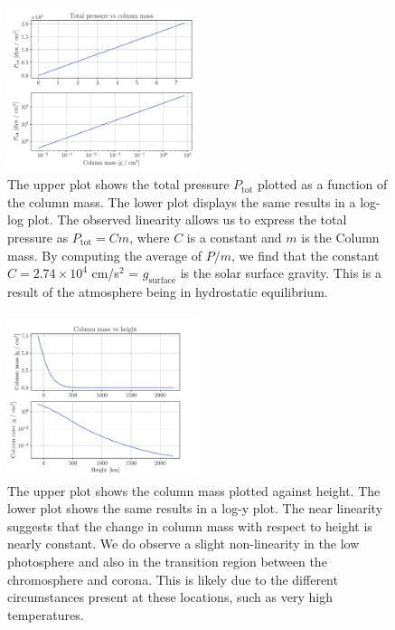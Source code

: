 \documentclass[a4paper,11.5pt,]{article}
\begin{document}
\begin{multicols}{2}
\begin{figure}[H]
    \centering
    \includegraphics[width = 0.5\textwidth]{figures/1.2/FALCpressurelarge.pdf}
    \caption{The upper plot shows the total pressure $P_\mathrm{tot}$ plotted as a function of the column mass. The lower plot displays the same results in a log-log plot. The observed linearity allows us to express the total pressure as $P_\mathrm{tot} = Cm$, where $C$ is a constant and $m$ is the Column mass. By computing the average of $P/m$, we find that the constant $C = 2.74\times 10^4$ cm/s$^2$ = $g_\mathrm{surface}$ is the solar surface gravity. This is a result of the atmosphere being in hydrostatic equilibrium.}
    \label{fig: FALC P_tot/m}
\end{figure}

\begin{figure}[H]
    \centering
    \includegraphics[width = 0.5\textwidth]{figures/1.2/FALCcolumnmass_heightlarge.pdf}
    \caption{The upper plot shows the column mass plotted against height. The lower plot shows the same results in a log-y plot. The near linearity suggests that the change in column mass with respect to height is nearly constant. We do observe a slight non-linearity in the low photosphere and also in the transition region between the chromosphere and corona. This is likely due to the different circumstances present at these locations, such as very high temperatures.}
    \label{fig: FALC m/h}
\end{figure}


\end{multicols}
\end{document}
